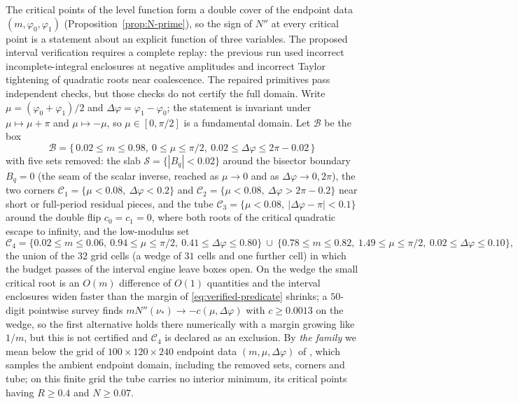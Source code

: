 \documentclass[11pt]{article}
\theoremstyle{remark}
\begin{document}
The critical points of the level function form a double cover of the
endpoint data $(m,\varphi_0,\varphi_1)$ (Proposition~\ref{prop:N-prime}),
so the sign of $N''$ at every critical point is a statement about an
explicit function of three variables.  The proposed interval verification
requires a complete replay: the previous run used incorrect incomplete-integral
enclosures at negative amplitudes and incorrect Taylor tightening of
quadratic roots near coalescence.  The repaired primitives pass independent
checks, but those checks do not certify the full domain.  Write $\mu=(\varphi_0+\varphi_1)/2$ and
$\Delta\varphi=\varphi_1-\varphi_0$; the statement is invariant under
$\mu\mapsto\mu+\pi$ and $\mu\mapsto-\mu$, so $\mu\in[0,\pi/2]$ is a
fundamental domain.  Let $\mathcal B$ be the box
\[
 \mathcal B=\{\,0.02\le m\le 0.98,\ 0\le\mu\le\pi/2,\ 0.02\le\Delta\varphi\le 2\pi-0.02\,\}
\]
with five sets removed: the slab $\mathcal S=\{|B_q|<0.02\}$ around the
bisector boundary $B_q=0$ (the seam of the scalar inverse, reached as
$\mu\to0$ and as $\Delta\varphi\to0,2\pi$), the two corners
$\mathcal C_1=\{\mu<0.08,\ \Delta\varphi<0.2\}$ and
$\mathcal C_2=\{\mu<0.08,\ \Delta\varphi>2\pi-0.2\}$ near short or
full-period residual pieces, and the tube
$\mathcal C_3=\{\mu<0.08,\ |\Delta\varphi-\pi|<0.1\}$ around the double
flip $c_0=c_1=0$, where both roots of the critical quadratic escape to
infinity, and the low-modulus set
\[
 \mathcal C_4=\{0.02\le m\le0.06,\ 0.94\le\mu\le\pi/2,\ 0.41\le\Delta\varphi\le0.80\}
 \ \cup\ \{0.78\le m\le0.82,\ 1.49\le\mu\le\pi/2,\ 0.02\le\Delta\varphi\le0.10\},
\]
the union of the $32$ grid cells (a wedge of $31$ cells and one further
cell) in which the budget passes of the interval engine leave boxes
open.  On the wedge the small critical root is an $O(m)$ difference of
$O(1)$ quantities and the interval enclosures widen faster than the
margin of \eqref{eq:verified-predicate} shrinks; a $50$-digit pointwise
survey finds $mN''(\nu_*)\to-c(\mu,\Delta\varphi)$ with $c\ge0.0013$ on the
wedge, so the first alternative holds there numerically with a margin
growing like $1/m$, but this is not certified and $\mathcal C_4$ is
declared as an exclusion.  By \emph{the family} we mean below the grid of
$100\times120\times240$ endpoint data $(m,\mu,\Delta\varphi)$ of
, which samples the ambient endpoint
domain, including the removed sets, corners and tube; on this finite grid the tube
carries no interior minimum, its critical points having $R\ge0.4$ and
$N\ge0.07$.
\end{document}

